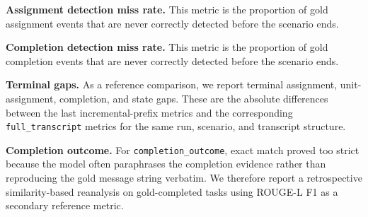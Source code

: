 \textbf{Assignment detection miss rate.} This metric is the proportion of gold assignment events that are never correctly detected before the scenario ends.

\textbf{Completion detection miss rate.} This metric is the proportion of gold completion events that are never correctly detected before the scenario ends.

\textbf{Terminal gaps.} As a reference comparison, we report terminal assignment, unit-assignment, completion, and state gaps. These are the absolute differences between the last incremental-prefix metrics and the corresponding \texttt{full\_transcript} metrics for the same run, scenario, and transcript structure.

\textbf{Completion outcome.} For \texttt{completion\_outcome}, exact match proved too strict because the model often paraphrases the completion evidence rather than reproducing the gold message string verbatim. We therefore report a retrospective similarity-based reanalysis on gold-completed tasks using ROUGE-L F1 as a secondary reference metric.
